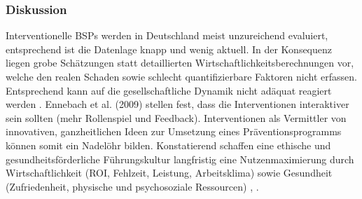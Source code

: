 \documentclass[a4paper]{article}
\begin{document}
\subsubsection*{Diskussion}


Interventionelle BSPs werden in Deutschland meist unzureichend evaluiert, entsprechend ist die Datenlage knapp und wenig aktuell. In der Konsequenz liegen grobe Schätzungen statt detaillierten Wirtschaftlichkeitsberechnungen vor, welche den realen Schaden sowie schlecht quantifizierbare Faktoren nicht erfassen. Entsprechend kann auf die gesellschaftliche Dynamik nicht adäquat reagiert werden . Ennebach et al. (2009) stellen fest, dass die Interventionen interaktiver sein sollten (mehr Rollenspiel und Feedback). Interventionen als Vermittler von innovativen, ganzheitlichen Ideen zur Umsetzung eines Präventionsprogramms können somit ein Nadelöhr bilden. Konstatierend schaffen eine ethische und gesundheitsförderliche Führungskultur langfristig eine Nutzenmaximierung durch Wirtschaftlichkeit (ROI, Fehlzeit, Leistung, Arbeitsklima)  sowie Gesundheit (Zufriedenheit, physische und psychosoziale Ressourcen) , .
\newpage
\renewcommand{\refname}{Literaturverzeichnis}


\end{document}
